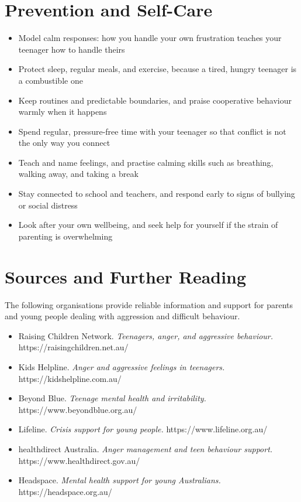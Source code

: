 \section*{Prevention and Self-Care}
\begin{itemize}
    \item Model calm responses: how you handle your own frustration teaches your teenager how to handle theirs
    \item Protect sleep, regular meals, and exercise, because a tired, hungry teenager is a combustible one
    \item Keep routines and predictable boundaries, and praise cooperative behaviour warmly when it happens
    \item Spend regular, pressure-free time with your teenager so that conflict is not the only way you connect
    \item Teach and name feelings, and practise calming skills such as breathing, walking away, and taking a break
    \item Stay connected to school and teachers, and respond early to signs of bullying or social distress
    \item Look after your own wellbeing, and seek help for yourself if the strain of parenting is overwhelming
\end{itemize}

\section*{Sources and Further Reading}
The following organisations provide reliable information and support for parents and young people dealing with aggression and difficult behaviour.

\begin{itemize}
    \item Raising Children Network. \textit{Teenagers, anger, and aggressive behaviour.} https://raisingchildren.net.au/
    \item Kids Helpline. \textit{Anger and aggressive feelings in teenagers.} https://kidshelpline.com.au/
    \item Beyond Blue. \textit{Teenage mental health and irritability.} https://www.beyondblue.org.au/
    \item Lifeline. \textit{Crisis support for young people.} https://www.lifeline.org.au/
    \item healthdirect Australia. \textit{Anger management and teen behaviour support.} https://www.healthdirect.gov.au/
    \item Headspace. \textit{Mental health support for young Australians.} https://headspace.org.au/
\end{itemize}

\clearpage
